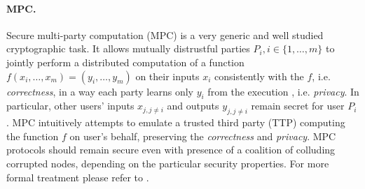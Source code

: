 \documentclass[
  digital, %
  twoside, %
  table,   %
  lof,     %
  lot,     %
]{fithesis3}
\theoremstyle{definition}
\theoremstyle{remark}
\begin{document}
\paragraph{MPC.}%
Secure multi-party computation (MPC) is a very generic and well studied cryptographic task.
It allows mutually distrustful parties $P_i, i \in \{1,\dots,m\}$ to jointly perform a distributed computation of a function $f(x_i,\dots,x_m) = (y_i,\dots,y_m)$ on their inputs $x_i$ consistently with the $f$, i.e. \emph{correctness}, in a way each party learns only $y_i$ from the execution , i.e. \emph{privacy}. In particular, other users' inputs $x_{j, j \neq i}$ and outputs $y_{j, j \neq i}$ remain secret for user $P_i$.
MPC intuitively attempts to emulate a trusted third party (TTP) computing the function $f$ on user's behalf, preserving the \emph{correctness} and \emph{privacy}.
MPC protocols should remain secure even with presence of a coalition of colluding corrupted nodes, depending on the particular security properties.
For more formal treatment please refer to \cite{G09}.
\end{document}
